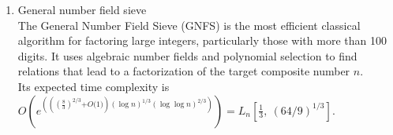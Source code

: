 \documentclass[sigconf,balance=false]{acmart}
\newcommand{\myparagraph}[1]{\smallskip\textbf{\textit{#1}:}\hspace{3pt}}
\begin{document}
\begin{enumerate}
\item General number field sieve \ \\
The General Number Field Sieve (GNFS) is the most efficient classical algorithm for factoring large integers, particularly those with more than 100 digits. It uses algebraic number fields and polynomial selection to find relations that lead to a factorization of the target composite number $n$.\\
Its expected time complexity is\\ $O\left(e^{\left( \left(\left(\frac{8}{3}\right)^{2\text{/}3}\text{+} O\text{(}1 \text{)}\right)\left(\log n\right)^{1\text{/}3}\left(\log\log n\right)^{2\text{/}3} \right)} \right)=L_{n}\left[\frac{1}{3}, \ \left(64\text{/}9\right)^{1\text{/}3} \right]$.

\end{enumerate}



\end{document}
